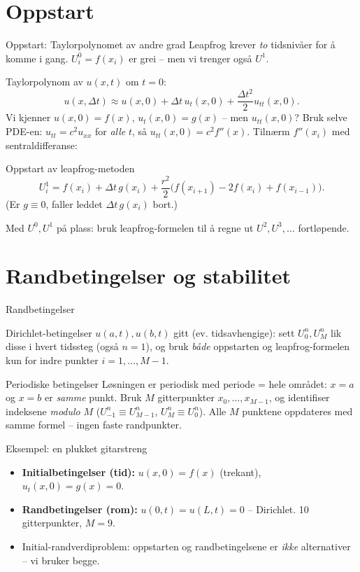 \documentclass[11pt,aspectratio=169]{beamer}
\begin{document}
\section{Oppstart}

\begin{frame}{Oppstart: Taylorpolynomet av andre grad}
Leapfrog krever \emph{to} tidsnivåer for å komme i gang. $U_i^0=f(x_i)$ er grei -- men vi trenger også $U^1$.

Taylorpolynom av $u(x,t)$ om $t=0$:
\[
u(x,\Delta t) \approx u(x,0) + \Delta t\,u_t(x,0) + \frac{\Delta t^2}{2}u_{tt}(x,0).
\]
Vi kjenner $u(x,0)=f(x)$, $u_t(x,0)=g(x)$ -- men $u_{tt}(x,0)$? Bruk selve PDE-en: $u_{tt}=c^2u_{xx}$ for \emph{alle} $t$, så $u_{tt}(x,0)=c^2f''(x)$. Tilnærm $f''(x_i)$ med sentraldifferanse:
\begin{oppsumb}{Oppstart av leapfrog-metoden}
\[
U_i^1 = f(x_i) + \Delta t\,g(x_i) + \frac{r^2}{2}\big(f(x_{i+1})-2f(x_i)+f(x_{i-1})\big).
\]
(Er $g\equiv0$, faller leddet $\Delta t\,g(x_i)$ bort.)
\end{oppsumb}
Med $U^0,U^1$ på plass: bruk leapfrog-formelen til å regne ut $U^2,U^3,\ldots$ fortløpende.
\end{frame}

\section{Randbetingelser og stabilitet}

\begin{frame}{Randbetingelser}
\begin{defnb}{Dirichlet-betingelser}
$u(a,t),u(b,t)$ gitt (ev. tidsavhengige): sett $U_0^n,U_M^n$ lik disse i hvert tidssteg (også $n=1$), og bruk \emph{både} oppstarten og leapfrog-formelen kun for indre punkter $i=1,\ldots,M-1$.
\end{defnb}
\begin{defnb}{Periodiske betingelser}
Løsningen er periodisk med periode = hele området: $x=a$ og $x=b$ er \emph{samme} punkt. Bruk $M$ gitterpunkter $x_0,\ldots,x_{M-1}$, og identifiser indeksene \emph{modulo} $M$ ($U_{-1}^n\equiv U_{M-1}^n$, $U_M^n\equiv U_0^n$). Alle $M$ punktene oppdateres med samme formel -- ingen faste randpunkter.
\end{defnb}
\end{frame}

\begin{frame}{Eksempel: en plukket gitarstreng}
\centering

\begin{itemize}\small
\item \textbf{Initialbetingelser (tid):} $u(x,0)=f(x)$ (trekant), $u_t(x,0)=g(x)=0$.
\item \textbf{Randbetingelser (rom):} $u(0,t)=u(L,t)=0$ -- Dirichlet. 10 gitterpunkter, $M=9$.
\item Initial-randverdiproblem: oppstarten og randbetingelsene er \emph{ikke} alternativer -- vi bruker begge.
\end{itemize}
\end{frame}
\end{document}
